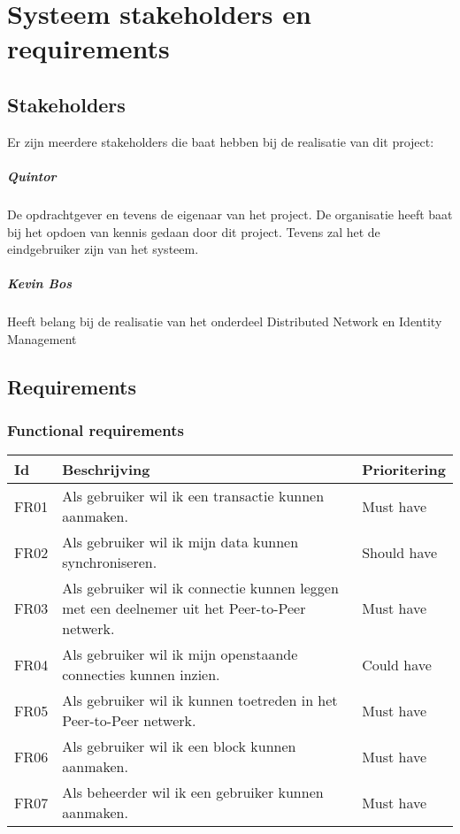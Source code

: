 \chapter{Systeem stakeholders en requirements}

\section{Stakeholders}

Er zijn meerdere stakeholders die baat hebben bij de realisatie van dit project:

\paragraph{Quintor} De opdrachtgever en tevens de eigenaar van het project. De organisatie heeft baat bij het opdoen van kennis gedaan door dit project. Tevens zal het de eindgebruiker zijn van het systeem.

\paragraph{Kevin Bos} Heeft belang bij de realisatie van het onderdeel Distributed Network en Identity Management

\newpage
\section{Requirements}

\subsection{Functional requirements}

\begin{tabular}{|p{1.1cm}|p{8cm}|p{3cm}|}
  \hline
  \textbf{Id} & \textbf{Beschrijving} & \textbf{Prioritering} \\
  \hline
  FR01 & Als gebruiker wil ik een transactie kunnen aanmaken. & Must have \\
  \hline
  FR02 & Als gebruiker wil ik mijn data kunnen synchroniseren. & Should have \\
  \hline
  FR03 & Als gebruiker wil ik connectie kunnen leggen met een deelnemer uit het Peer-to-Peer netwerk. & Must have \\
  \hline
  FR04 & Als gebruiker wil ik mijn openstaande connecties kunnen inzien. & Could have \\
  \hline
  FR05 & Als gebruiker wil ik kunnen toetreden in het Peer-to-Peer netwerk. & Must have \\
  \hline
  FR06 & Als gebruiker wil ik een block kunnen aanmaken. & Must have \\
  \hline
  FR07 & Als beheerder wil ik een gebruiker kunnen aanmaken. & Must have \\
  \hline
\end{tabular}

